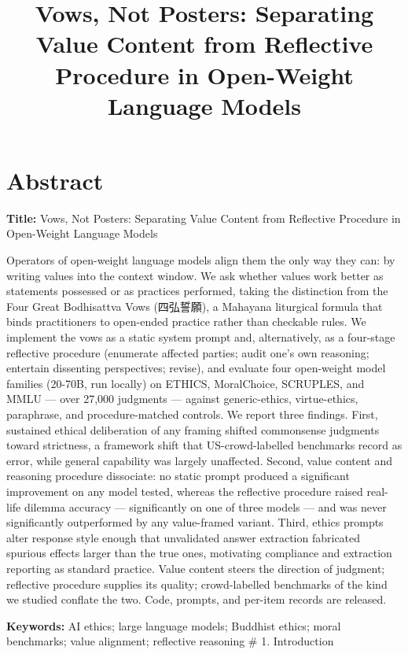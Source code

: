 \documentclass[
  11pt,
]{article}
\title{Vows, Not Posters: Separating Value Content from Reflective Procedure in Open-Weight Language Models}
\author{}
\date{}
\begin{document}
\maketitle

\section{Abstract}\label{abstract}

\textbf{Title:} Vows, Not Posters: Separating Value Content from Reflective Procedure in Open-Weight Language Models

Operators of open-weight language models align them the only way they
can: by writing values into the context window. We ask whether values
work better as statements possessed or as practices performed, taking
the distinction from the Four Great Bodhisattva Vows (四弘誓願), a
Mahayana liturgical formula that binds practitioners to open-ended
practice rather than checkable rules. We implement the vows as a static
system prompt and, alternatively, as a four-stage reflective procedure
(enumerate affected parties; audit one's own reasoning; entertain
dissenting perspectives; revise), and evaluate four open-weight model
families (20-70B, run locally) on ETHICS, MoralChoice, SCRUPLES, and
MMLU --- over 27,000 judgments --- against generic-ethics,
virtue-ethics, paraphrase, and procedure-matched controls. We report
three findings. First, sustained ethical deliberation of any framing
shifted commonsense judgments toward strictness, a framework shift that
US-crowd-labelled benchmarks record as error, while general capability
was largely unaffected. Second, value content and reasoning procedure
dissociate: no static prompt produced a significant improvement on any
model tested, whereas the reflective procedure raised real-life dilemma
accuracy --- significantly on one of three models --- and was never
significantly outperformed by any value-framed variant. Third, ethics
prompts alter response style enough that unvalidated answer extraction
fabricated spurious effects larger than the true ones, motivating
compliance and extraction reporting as standard practice. Value content
steers the direction of judgment; reflective procedure supplies its
quality; crowd-labelled benchmarks of the kind we studied conflate the
two. Code, prompts, and per-item records are released.

\textbf{Keywords:} AI ethics; large language models; Buddhist ethics;
moral benchmarks; value alignment; reflective reasoning \# 1.
Introduction
\end{document}

